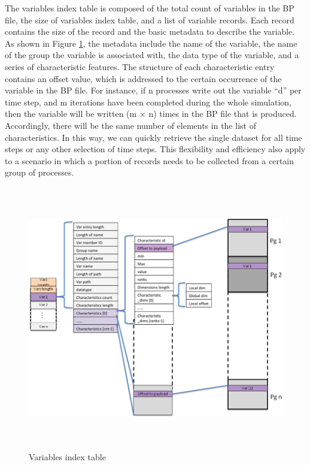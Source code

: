 The variables index table is composed of the total count of variables in the BP 
file, the size of variables index table, and a list of variable records. Each record 
contains the size of the record and the basic metadata to describe the variable. 
As shown in Figure \ref{fig:variables-index-table}, 
the metadata include the name of the variable, the name 
of the group the variable is associated with, the data type of the variable, and 
a series of characteristic features. The structure of each characteristic entry 
contains an offset value, which is addressed to the certain occurrence of the variable 
in the BP file. For instance, if n processes write out the variable ``d'' per time 
step, and m iterations have been completed during the whole simulation, then the 
variable will be written (m\textit{ }\ensuremath{\times} n) times in the BP file 
that is produced. Accordingly, there will be the same number of elements in the 
list of characteristics. In this way, we can quickly retrieve the single dataset 
for all time steps or any other selection of time steps. This flexibility and efficiency 
also apply to a scenario in which a portion of records needs to be collected from 
a certain group of processes. 

\begin{figure}[htbp]
\begin{center}
\includegraphics[width=420pt, height=327pt]{figures/variables-index-table.png}
\caption{Variables index table}
\label{fig:variables-index-table}
\end{center}
\end{figure}

